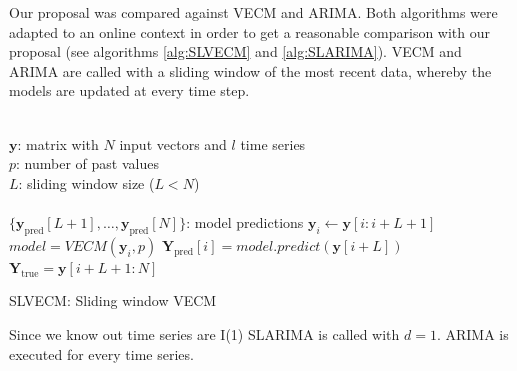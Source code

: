 {
}

Our proposal was compared against VECM and ARIMA. Both algorithms were adapted
to an online context in order to get a reasonable comparison with our proposal
(see algorithms \ref{alg:SLVECM} and \ref{alg:SLARIMA}). VECM and ARIMA are
called with a sliding window of the most recent data, whereby the models are
updated at every time step.

\begin{algorithm}[ht]
\begin{algorithmic}[1]
\REQUIRE $\,$ \\
$\mathbf{y}$: matrix with $N$ input vectors and $l$ time series\\
$p$: number of past values \\
$L$: sliding window size ($L<N$) \\
\ENSURE  $\,$ \\
$\{ \mathbf{y}_{\text{pred}}[L+1],\dots,\mathbf{y}_{\text{pred}}[N]\}$: model predictions 
    \STATE $\mathbf{y}_i \gets \mathbf{y}[i:i+L+1]$
        \STATE $model = VECM(\mathbf{y}_i, p)$
        \STATE $\mathbf{Y}_{\text{pred}}[i] = model.predict(\mathbf{y}[i+L])$
\ENDFOR
\STATE $\mathbf{Y}_{\text{true}} = \mathbf{y}[i+L+1:N] $
\end{algorithmic}
\caption{SLVECM: Sliding window VECM}
\label{alg:SLVECM}
\end{algorithm}

Since we know out time series are I(1) SLARIMA is called with $d=1$. ARIMA is
executed for every time series. 

